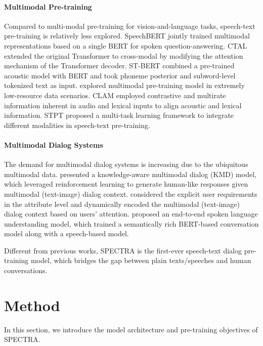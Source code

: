 \documentclass[11pt]{article}
\begin{document}
\paragraph{Multimodal Pre-training}
Compared to multi-modal pre-training for vision-and-language tasks, speech-text pre-training is relatively less explored. SpeechBERT \citep{chuang2020speechbert} jointly trained multimodal representations based on a single BERT for spoken question-answering. 
CTAL \citep{ctal} extended the original Transformer to cross-modal by modifying the attention mechanism of the Transformer decoder.
ST-BERT \citep{stbert} combined a pre-trained acoustic model with BERT and took phoneme posterior and subword-level tokenized text as input. 
\citet{self} explored multimodal pre-training model in extremely low-resource data scenarios.
CLAM \citep{calm} employed contrastive and multirate information inherent in audio and lexical inputs to align acoustic and lexical information.
STPT \cite{tang2022unified} proposed a multi-task learning framework to integrate different modalities in speech-text pre-training.


\paragraph{Multimodal Dialog Systems}
The demand for multimodal dialog systems \cite{lin2022duplex} is increasing due to the ubiquitous multimodal data. \citet{liao2018knowledge} presented a knowledge-aware multimodal dialog (KMD) model, which leveraged reinforcement learning to generate human-like responses given multimodal (text-image) dialog context. 
\citet{cui2019user} considered the explicit user requirements in
the attribute level and dynamically encoded the multimodal (text-image) dialog context based on users' attention.
\citet{sunder2022towards} proposed an end-to-end spoken language understanding model, which trained a semantically rich BERT-based conversation model along with a speech-based model.

Different from previous works, SPECTRA is the first-ever speech-text dialog pre-training model, which bridges the gap between plain texts/speeches and human conversations.




\section{Method}

In this section, we introduce the model architecture and pre-training objectives of SPECTRA.
\end{document}
